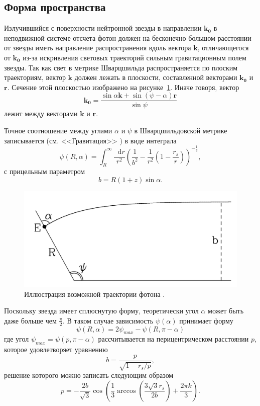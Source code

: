 \documentclass[14pt,a4paper]{extarticle}
\newcommand{\be}{\begin{equation}}
\newcommand{\ee}{\end{equation}}
\newcommand*\df {\mathop{}\!\mathrm{d}}
\begin{document}
		\subsection{Форма пространства}\label{sub:SS}
		    Излучившийся с поверхности нейтронной звезды в направлении $\bm{k_0}$ в неподвижной системе отсчета фотон должен на бесконечно большом расстоянии от звезды иметь направление распространения вдоль вектора  $\bm{k}$,
		    отличающегося от $\bm{k_0}$ из-за искривления световых траекторий сильным гравитационным полем звезды.
		    Так как свет в метрике Шварцшильда распространяется по плоским траекториям, вектор $\bm{k}$ должен лежать в плоскости, составленной векторами $\bm{k_0}$ и $\bm r$. Сечение этой плоскостью изображено на рисунке~\ref{fig:trajectory}.
		    Иначе говоря, вектор 
		    \be\label{k0}
		    	\bm{k_0}=\frac{\sin\alpha \bm k + \sin(\psi-\alpha) \bm r}{\sin \psi}
		    \ee 
		    лежит между векторами $\bm{k}$ и $\bm{r}$.  


		    Точное соотношение между углами $\alpha$ и $\psi$ в Шварцшильдовской метрике записывается (см. <<Гравитация>> \cite{Misner1973} ) в виде интеграла
		    \be\label{eq:bendexact}
		    	\psi(R,\alpha)=\int_R^{\infty} \frac{\df r}{r^2} \left(\frac1{b^2}-\frac1{r^2}\left(1-\frac{r_s}r\right)\right)^{-\frac12},
		    \ee
		    с прицельным параметром 
		    \be\label{eq:impact}
		    	b=R(1+z)\sin\alpha.
		    \ee
			\begin{figure}[H]
				\centering
				\includegraphics[scale=0.3]{Bb02.png}
				\caption{\small
				Иллюстрация возможной траектории фотона \cite{Beloborodov2002}.}\label{fig:trajectory}
			\end{figure}
		    		
		    Поскольку звезда имеет сплюснутую форму, теоретически угол 
		    $\alpha$
		    может быть даже больше чем 
		    $\frac{\pi}2$.
		    В таком случае зависимость 
		    $\psi(\alpha)$
		    принимает форму 
		    \be
		    	\psi(R,\alpha)=2\psi_{max}-\psi(R,\pi-\alpha)
		    \ee
		    где угол
 			$\psi_{max} = \psi (p,\pi-\alpha)$
		   	рассчитывается на перицентрическом расстоянии 
		    $p$, которое удовлетворяет уравнению
		    \be
				b=\frac{p}{\sqrt{1-r_s/p}},
			\ee
			решение которого можно записать следующим образом
			\be
				p=-\frac{2b}{\sqrt3}\cos \left(\frac13 \arccos \left(\frac{3\sqrt3 r_s}{2b}\right)+\frac{2\pi k}{3}\right).
			\ee
			
\end{document}
